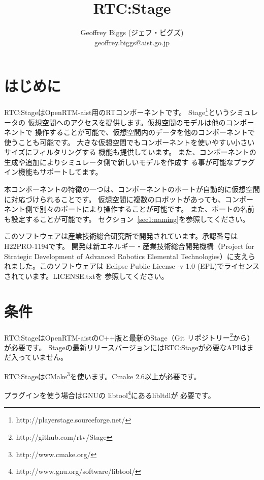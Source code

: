 \documentclass[a4paper,10pt]{article}
\title{RTC:Stage}
\author{Geoffrey Biggs (ジェフ・ビグズ)\\
geoffrey.biggs@aist.go.jp}
\newenvironment{Japanese}{%
  \CJKfamily{min}%
  \CJKtilde
  \CJKnospace}{}
\begin{document}
\begin{CJK}{UTF8}{}
\begin{Japanese}

\maketitle

\section{はじめに}
\label{sec:intro}

RTC:StageはOpenRTM-aist用のRTコンポーネントです。
Stage\footnote{http://playerstage.sourceforge.net/}というシミュレータの
仮想空間へのアクセスを提供します。仮想空間のモデルは他のコンポーネントで
操作することが可能で、仮想空間内のデータを他のコンポーネントで使うことも可能です。
大きな仮想空間でもコンポーネントを使いやすい小さいサイズにフィルタリングする
機能も提供しています。
また、コンポーネントの生成や追加によりシミュレータ側で新しいモデルを作成す
る事が可能なプラグイン機能もサポートしてます。

本コンポーネントの特徴の一つは、コンポーネントのポートが自動的に仮想空間に対応づけられることです。
仮想空間に複数のロボットがあっても、コンポーネント側で別々のポートにより操作することが可能です。
また、ポートの名前も設定することが可能です。
セクション~\ref{sec1:naming}を参照してください。

このソフトウェアは産業技術総合研究所で開発されています。承認番号はH22PRO-1194です。
開発は新エネルギー・産業技術総合開発機構（Project for Strategic Development of Advanced
Robotics Elemental Technologies）に支えられました。このソフトウェアは
Eclipse Public License -v 1.0 (EPL)でライセンスされています。LICENSE.txtを
参照してください。

\section{条件}
\label{sec:requirements}

RTC:StageはOpenRTM-aistのC++版と最新のStage（Git
リポジトリー\footnote{http://github.com/rtv/Stage}から）が必要です。
Stageの最新リリースバージョンにはRTC:Stageが必要なAPIはまだ入っていません。

RTC:StageはCMake\footnote{http://www.cmake.org/}を使います。Cmake
2.6以上が必要です。

プラグインを使う場合はGNUの
libtool\footnote{http://www.gnu.org/software/libtool/}にあるlibltdlが
必要です。


\end{Japanese}
\end{CJK}
\end{document}
